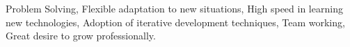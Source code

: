



\scriptsize
Problem Solving, Flexible adaptation to new situations, High speed in learning new technologies, Adoption of iterative development techniques, Team working, Great desire to grow professionally.

\begin{cventries}


\end{cventries}